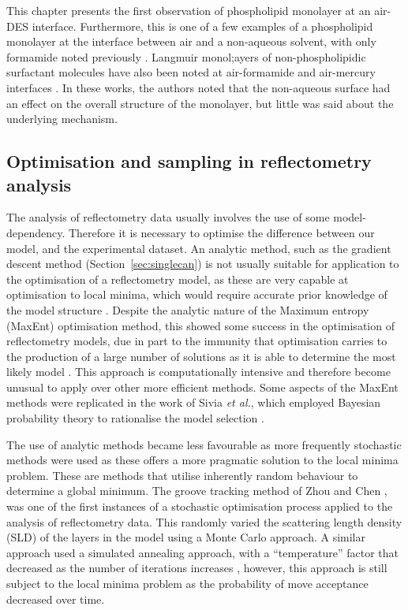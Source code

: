 This chapter presents the first observation of phospholipid monolayer at an air-DES interface.
Furthermore, this is one of a few examples of a phospholipid monolayer at the interface between air and a non-aqueous solvent, with only formamide noted previously \cite{graner_phospholipidic_1995}.
Langmuir monol;ayers of non-phospholipidic surfactant molecules have also been noted at air-formamide and air-mercury interfaces \cite{weinbach_self-assembled_1993,magnussen_self-assembly_1996,kraack_structure_2002}.
In these works, the authors noted that the non-aqueous surface had an effect on the overall structure of the monolayer, but little was said about the underlying mechanism.

\subsection{Optimisation and sampling in reflectometry analysis}
The analysis of reflectometry data usually involves the use of some model-dependency.
Therefore it is necessary to optimise the difference between our model, and the experimental dataset.
An analytic method, such as the gradient descent method (Section~\ref{sec:singlecan}) is not usually suitable for application to the optimisation of a reflectometry model, as these are very capable at optimisation to local minima, which would require accurate prior knowledge of the model structure \cite{lovell_analysis_1999}.
Despite the analytic nature of the Maximum entropy (MaxEnt) optimisation method, this showed some success in the optimisation of reflectometry models, due in part to the immunity that optimisation carries to the production of a large number of solutions as it is able to determine the most likely model \cite{geoghegan_experimental_1996,bucknall_neutron_1997}.
This approach is computationally intensive and therefore become unusual to apply over other more efficient methods.
Some aspects of the MaxEnt methods were replicated in the work of Sivia \emph{et al.}, which employed Bayesian probability theory to rationalise the model selection \cite{geoghegan_experimental_1996,sivia_introduction_1993,sivia_bayesian_1998,sivia_analysis_1991}.

The use of analytic methods became less favourable as more frequently stochastic methods were used as these offers a more pragmatic solution to the local minima problem.
These are methods that utilise inherently random behaviour to determine a global minimum.
The groove tracking method of Zhou and Chen \cite{zhou_model-independent_1993,zhou_theoretical_1995}, was one of the first instances of a stochastic optimisation process applied to the analysis of reflectometry data.
This randomly varied the scattering length density (SLD) of the layers in the model using a Monte Carlo approach.
A similar approach used a simulated annealing approach, with a ``temperature'' factor that decreased as the number of iterations increases \cite{kunz_model-free_1993}, however, this approach is still subject to the local minima problem as the probability of move acceptance decreased over time.


